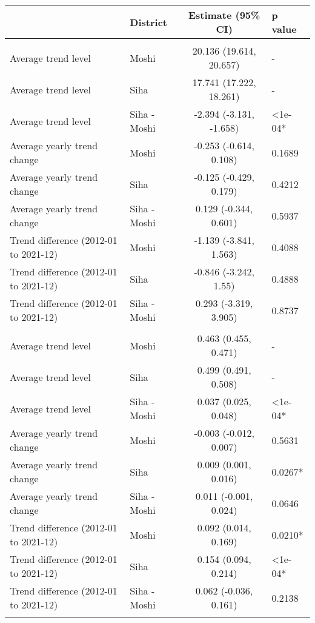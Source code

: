 \begingroup
\fontsize{12.0pt}{14.4pt}\selectfont
\begin{longtable}{l|lcl}
\toprule
 & District & Estimate (95\% CI) & p value \\ 
\midrule\addlinespace[2.5pt]
\multicolumn{4}{l}{PM2.5 (μg/m³)} \\[2.5pt] 
\midrule\addlinespace[2.5pt]
Average trend level & Moshi & 20.136 (19.614, 20.657) & - \\ 
Average trend level & Siha & 17.741 (17.222, 18.261) & - \\ 
Average trend level & Siha - Moshi & -2.394 (-3.131, -1.658) & <1e-04* \\ 
Average yearly trend change & Moshi & -0.253 (-0.614, 0.108) & 0.1689 \\ 
Average yearly trend change & Siha & -0.125 (-0.429, 0.179) & 0.4212 \\ 
Average yearly trend change & Siha - Moshi & 0.129 (-0.344, 0.601) & 0.5937 \\ 
Trend difference (2012-01 to 2021-12) & Moshi & -1.139 (-3.841, 1.563) & 0.4088 \\ 
Trend difference (2012-01 to 2021-12) & Siha & -0.846 (-3.242, 1.55) & 0.4888 \\ 
Trend difference (2012-01 to 2021-12) & Siha - Moshi & 0.293 (-3.319, 3.905) & 0.8737 \\ 
\midrule\addlinespace[2.5pt]
\multicolumn{4}{l}{Greenness (NDVI)} \\[2.5pt] 
\midrule\addlinespace[2.5pt]
Average trend level & Moshi & 0.463 (0.455, 0.471) & - \\ 
Average trend level & Siha & 0.499 (0.491, 0.508) & - \\ 
Average trend level & Siha - Moshi & 0.037 (0.025, 0.048) & <1e-04* \\ 
Average yearly trend change & Moshi & -0.003 (-0.012, 0.007) & 0.5631 \\ 
Average yearly trend change & Siha & 0.009 (0.001, 0.016) & 0.0267* \\ 
Average yearly trend change & Siha - Moshi & 0.011 (-0.001, 0.024) & 0.0646 \\ 
Trend difference (2012-01 to 2021-12) & Moshi & 0.092 (0.014, 0.169) & 0.0210* \\ 
Trend difference (2012-01 to 2021-12) & Siha & 0.154 (0.094, 0.214) & <1e-04* \\ 
Trend difference (2012-01 to 2021-12) & Siha - Moshi & 0.062 (-0.036, 0.161) & 0.2138 \\ 
\midrule\addlinespace[2.5pt]
\multicolumn{4}{l}{Min. temp. (ºC)} \\[2.5pt] 

\end{longtable}
